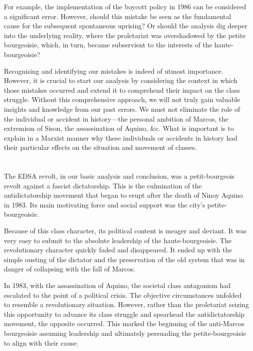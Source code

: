 For example, 
the implementation of the boycott policy in 1986 
can be considered a significant error. 
However, should this mistake be seen as the fundamental cause 
for the subsequent spontaneous uprising? 
Or should the analysis dig deeper into the underlying reality, 
where the proletariat was overshadowed by the petite bourgeoisie, 
which, in turn, 
became subservient to the interests of the haute-bourgeoisie?

Recognising and identifying our mistakes is indeed of utmost importance. 
However, it is crucial to start our analysis by considering 
the context in which those mistakes occurred 
and extend it to comprehend their impact on the class struggle. 
Without this comprehensive approach, 
we will not truly gain valuable insights and knowledge from our past errors.
We must not eliminate the role of the individual 
or accident in history---the 
personal ambition of Marcos, 
the extremism of Sison, 
the assassination of Aquino, \&c. 
What is important is to explain in a Marxist manner 
why these individuals or accidents in history 
had their particular effects on the situation and movement of classes.


\section{}
The EDSA revolt, 
in our basic analysis and conclusion, 
was a petit-bourgeois revolt against a fascist dictatorship. 
This is the culmination of the antidictatorship movement 
that began to erupt after the death of Ninoy Aquino in 1983. 
Its main motivating force and social support was the city's petite-bourgeoisie.

Because of this class character, 
its political content is meager and deviant. 
It was very easy to submit to the absolute leadership of the haute-bourgeoisie. 
The revolutionary character quickly faded and disappeared. 
It ended up with the simple ousting of the dictator 
and the preservation of the old system that was in danger of collapsing 
with the fall of Marcos.

In 1983, with the assassination of Aquino, 
the societal class antagonism had escalated 
to the point of a political crisis. 
The objective circumstances unfolded 
to resemble a revolutionary situation. 
However, rather than the proletariat seizing this opportunity 
to advance its class struggle 
and spearhead the antidictatorship movement, 
the opposite occurred. 
This marked the beginning of the anti-Marcos bourgeoisie 
assuming leadership and ultimately persuading 
the petite-bourgeoisie to align with their cause.

